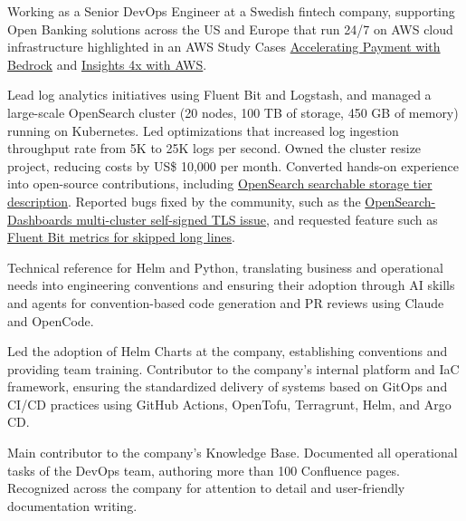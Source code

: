 \documentclass[10pt,a4paper]{altacv}
\begin{document}
\bigskip
\bigskip

Working as a Senior DevOps Engineer at a Swedish fintech company, supporting Open Banking solutions across the US and Europe that run 24/7 on AWS cloud infrastructure highlighted in an AWS Study Cases \href{https://aws.amazon.com/solutions/case-studies/trustly-case-study/}{Accelerating Payment with Bedrock} and \href{https://aws.amazon.com/solutions/case-studies/trustly-using-amazon-quicksight-case-study/}{Insights 4x with AWS}.

\medskip

Lead log analytics initiatives using Fluent Bit and Logstash, and managed a large-scale OpenSearch cluster (20 nodes, 100 TB of storage, 450 GB of memory) running on Kubernetes. Led optimizations that increased log ingestion throughput rate from 5K to 25K logs per second. Owned the cluster resize project, reducing costs by US\$ 10,000 per month. Converted hands-on experience into open-source contributions, including \href{https://github.com/opensearch-project/documentation-website/pull/4597}{OpenSearch searchable storage tier description}. Reported bugs fixed by the community, such as the \href{https://github.com/opensearch-project/OpenSearch-Dashboards/issues/2829#issuecomment-1611585079}{OpenSearch-Dashboards multi-cluster self-signed TLS issue}, and requested feature such as \href{https://github.com/fluent/fluent-bit/issues/11457}{Fluent Bit metrics for skipped long lines}.

\medskip

Technical reference for Helm and Python, translating business and operational needs into engineering conventions and ensuring their adoption through AI skills and agents for convention-based code generation and PR reviews using Claude and OpenCode.

\medskip

Led the adoption of Helm Charts at the company, establishing conventions and providing team training. Contributor to the company's internal platform and IaC framework, ensuring the standardized delivery of systems based on GitOps and CI/CD practices using GitHub Actions, OpenTofu, Terragrunt, Helm, and Argo CD.

\medskip

Main contributor to the company's Knowledge Base. Documented all operational tasks of the DevOps team, authoring more than 100 Confluence pages. Recognized across the company for attention to detail and user-friendly documentation writing.

\medskip
\end{document}
